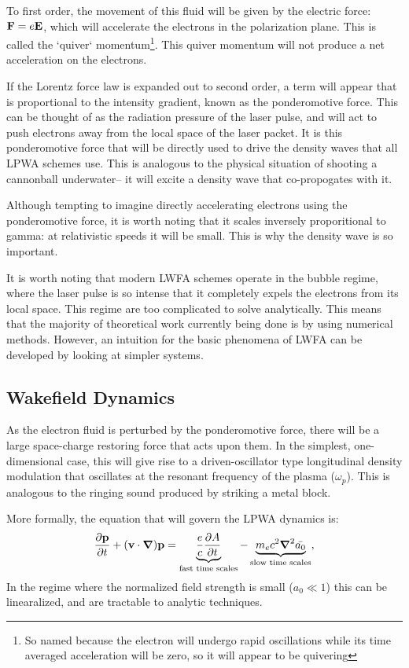 \documentclass[12pt,letter]{article}
\begin{document}
To first order, the movement of this fluid will be given by the electric force:
$\vb{F} = e\vb{E}$, which will accelerate the electrons in the polarization
plane. This is called the `quiver` momentum\footnote{So named because the electron will
undergo rapid oscillations while its time averaged acceleration will be zero, so it will appear to be quivering}. This quiver momentum will not produce a net acceleration on the 
electrons.

If the Lorentz force law is expanded out to second order, a term will appear that is
proportional to the intensity gradient, known as the ponderomotive force. This can be
thought of as the radiation pressure of the laser pulse, and will act to push
electrons away from the local space of the laser packet. It is this
ponderomotive force that will be directly used to drive the density waves that
all LPWA schemes use. This is analogous to the physical situation of shooting a
cannonball underwater-- it will excite a density wave that co-propogates with
it.

Although tempting to imagine directly accelerating electrons using
the ponderomotive force, it is worth noting that it scales inversely proporitional to gamma: at relativistic speeds it will be small. This is why the density wave is so important.


It is worth noting that modern LWFA schemes operate in the bubble regime, where the laser pulse is so
intense that it completely expels the electrons from its local space.
This regime are too complicated to solve analytically. This means that the 
majority of theoretical work currently being done is by using numerical methods. However, an intuition for the basic
phenomena of LWFA can be developed by looking at simpler systems.

\subsection{Wakefield Dynamics}

As the electron fluid is perturbed by the ponderomotive force, there will be a
large space-charge restoring force that acts upon them. In the simplest,
one-dimensional case, this will give rise to a driven-oscillator type
longitudinal density
modulation that
oscillates at the resonant frequency of the plasma ($\omega_p$). This is
analogous to the ringing sound produced by striking a metal block.

More formally, the equation that will govern the LPWA dynamics is:
\begin{equation}
    \label{eq:fullLPWA}
    \pdv{\vb{p}}{t} +(\vb{v} \cdot \grad)\vb{p} =
            \underbrace{\frac{e}{c}\pdv{A}{t}}_\text{fast time scales} -
            \underbrace{m_ec^2 \grad^2 \bar{a_0}}_\text{slow time scales},
    \end{equation}
In the regime where the normalized field strength is small ($a_0
\ll 1$) this can be linearalized, and are tractable to analytic
techniques. 
\end{document}
